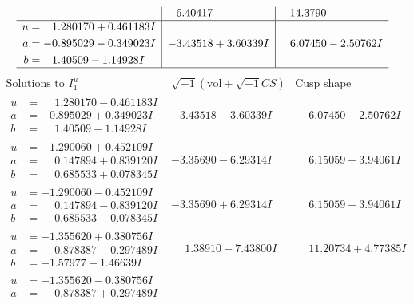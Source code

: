 \documentclass[1p]{elsarticle_modified}
\theoremstyle{definition}
\newcommand{\I}{\sqrt{-1}}
\begin{document}
$$\begin{array}{c|c|c}
 & \phantom{-}6.40417\phantom{ +0.000000I} & \phantom{-}14.3790\phantom{ +0.000000I} \\ \hline\begin{aligned}
u &= \phantom{-}1.280170 + 0.461183 I \\
a &= -0.895029 - 0.349023 I \\
b &= \phantom{-}1.40509 - 1.14928 I\end{aligned}
 & -3.43518 + 3.60339 I & \phantom{-}6.07450 - 2.50762 I\\
 \hline 
 \end{array}$$\newpage$$\begin{array}{c|c|c}  
\text{Solutions to }I^u_{1}& \I (\text{vol} + \sqrt{-1}CS) & \text{Cusp shape}\\
 \hline 
\begin{aligned}
u &= \phantom{-}1.280170 - 0.461183 I \\
a &= -0.895029 + 0.349023 I \\
b &= \phantom{-}1.40509 + 1.14928 I\end{aligned}
 & -3.43518 - 3.60339 I & \phantom{-}6.07450 + 2.50762 I \\ \hline\begin{aligned}
u &= -1.290060 + 0.452109 I \\
a &= \phantom{-}0.147894 + 0.839120 I \\
b &= \phantom{-}0.685533 + 0.078345 I\end{aligned}
 & -3.35690 - 6.29314 I & \phantom{-}6.15059 + 3.94061 I \\ \hline\begin{aligned}
u &= -1.290060 - 0.452109 I \\
a &= \phantom{-}0.147894 - 0.839120 I \\
b &= \phantom{-}0.685533 - 0.078345 I\end{aligned}
 & -3.35690 + 6.29314 I & \phantom{-}6.15059 - 3.94061 I \\ \hline\begin{aligned}
u &= -1.355620 + 0.380756 I \\
a &= \phantom{-}0.878387 - 0.297489 I \\
b &= -1.57977 - 1.46639 I\end{aligned}
 & \phantom{-}1.38910 - 7.43800 I & \phantom{-}11.20734 + 4.77385 I \\ \hline\begin{aligned}
u &= -1.355620 - 0.380756 I \\
a &= \phantom{-}0.878387 + 0.297489 I \\

\end{aligned}
\end{array}$$
\end{document}
